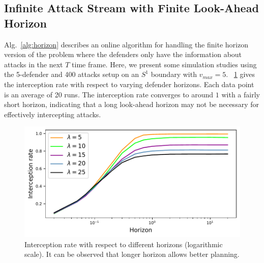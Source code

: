 \subsection{Infinite Attack Stream with Finite Look-Ahead Horizon}
Alg.~\ref{alg:horizon} describes an online \ours algorithm for handling the finite horizon version of the problem where the defenders only have the information about attacks in the next $T$ time frame.
Here, we present some simulation studies using the 5-defender and 400 attacks setup on an $S^1$ boundary with $v_{max} = 5$. ~\ref{fig:horizon} gives the interception rate with respect to varying defender horizons. Each data point is an average of 20 runs. The interception rate converges to around $1$ with a fairly short horizon, indicating that a long look-ahead horizon may not be necessary for effectively intercepting attacks.
\begin{figure}
    \vspace{-1mm}
    \centering
    \includegraphics[width=0.98\linewidth]{chapters/pd/fig/horizon.pdf}
    \vspace{-2mm}
    \caption{Interception rate with respect to different horizons (logarithmic scale). It can be observed that longer horizon allows better planning.}
    \label{fig:horizon}
    \vspace{-3mm}
\end{figure}

